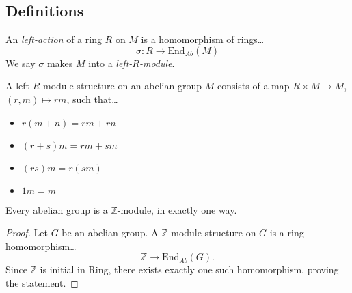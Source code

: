 \subsection{Definitions}

An \emph{left-action} of a ring $R$ on $M$ is a homomorphism of rings\dots
$$\sigma : R \rightarrow \textrm{End}_{Ab}(M)$$
We say $\sigma$ makes $M$ into a \emph{left-$R$-module}.\newline

\noindent A left-$R$-module structure on an abelian group $M$ consists of a map $R \times M \rightarrow M$,
$(r,m) \mapsto rm$, such that\dots
\begin{itemize}
  \item $r(m+n) = rm + rn$
  \item $(r+s)m = rm + sm$
  \item $(rs)m = r(sm)$
  \item $1m = m$
\end{itemize}

\begin{proposition}
Every abelian group is a $\mathbb{Z}$-module, in exactly one way.
\end{proposition}

\begin{proof}
Let $G$ be an abelian group. A $\mathbb{Z}$-module structure on $G$ is a ring homomorphism\dots
$$\mathbb{Z} \rightarrow \textrm{End}_{Ab}(G).$$
Since $\mathbb{Z}$ is initial in Ring, there exists exactly one such homomorphism, proving the statement.
\end{proof}